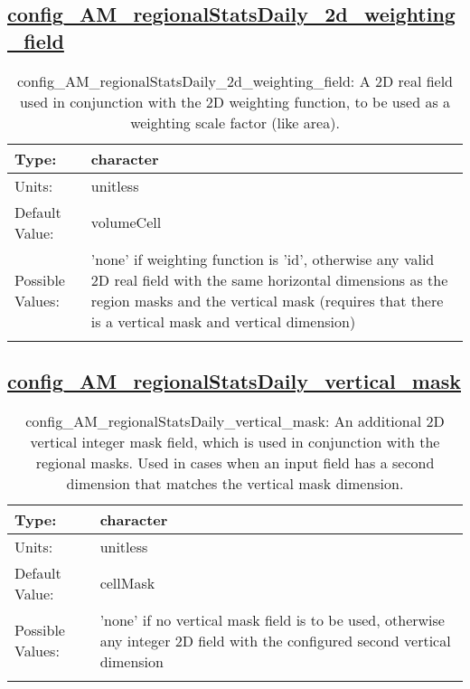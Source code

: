 \subsection[config\_AM\_regionalStatsDaily\_2d\_weighting\_field]{\hyperref[sec:nm_tab_AM_regionalStatsDaily]{config\_AM\_regionalStatsDaily\_2d\_weighting\_field}}
\label{subsec:nm_sec_config_AM_regionalStatsDaily_2d_weighting_field}
\begin{center}
\begin{longtable}{| p{2.0in} || p{4.0in} |}
    \hline
    Type: & character \\
    \hline
    Units: & \si{unitless} \\
    \hline
    Default Value: & volumeCell \\
    \hline
    Possible Values: & 'none' if weighting function is 'id', otherwise any valid 2D real field with the same horizontal dimensions as the region masks and the vertical mask (requires that there is a vertical mask and vertical dimension) \\
    \hline
    \caption{config\_AM\_regionalStatsDaily\_2d\_weighting\_field: A 2D real field used in conjunction with the 2D weighting function, to be used as a weighting scale factor (like area).}
\end{longtable}
\end{center}
\subsection[config\_AM\_regionalStatsDaily\_vertical\_mask]{\hyperref[sec:nm_tab_AM_regionalStatsDaily]{config\_AM\_regionalStatsDaily\_vertical\_mask}}
\label{subsec:nm_sec_config_AM_regionalStatsDaily_vertical_mask}
\begin{center}
\begin{longtable}{| p{2.0in} || p{4.0in} |}
    \hline
    Type: & character \\
    \hline
    Units: & \si{unitless} \\
    \hline
    Default Value: & cellMask \\
    \hline
    Possible Values: & 'none' if no vertical mask field is to be used, otherwise any integer 2D field with the configured second vertical dimension \\
    \hline
    \caption{config\_AM\_regionalStatsDaily\_vertical\_mask: An additional 2D vertical integer mask field, which is used in conjunction with the regional masks. Used in cases when an input field has a second dimension that matches the vertical mask dimension.}
\end{longtable}
\end{center}
